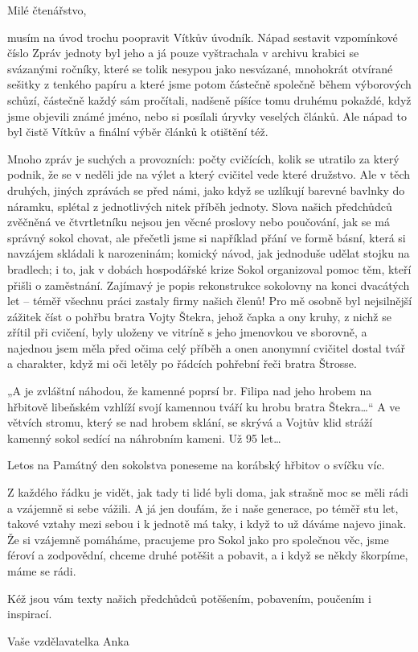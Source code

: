 Milé čtenářstvo,

musím na úvod trochu poopravit Vítkův úvodník. Nápad sestavit
vzpomínkové číslo Zpráv jednoty byl jeho a já pouze vyštrachala v
archivu krabici se svázanými ročníky, které se tolik nesypou jako
nesvázané, mnohokrát otvírané sešitky z tenkého papíru a které jsme
potom částečně společně během výborových schůzí, částečně každý sám
pročítali, nadšeně píšíce tomu druhému pokaždé, když jsme objevili známé
jméno, nebo si posílali úryvky veselých článků. Ale nápad to byl čistě
Vítkův a finální výběr článků k otištění též.

Mnoho zpráv je suchých a provozních: počty cvičících, kolik se utratilo
za který podnik, že se v neděli jde na výlet a který cvičitel vede které
družstvo. Ale v těch druhých, jiných zprávách se před námi, jako když se
uzlíkují barevné bavlnky do náramku, splétal z jednotlivých nitek příběh
jednoty. Slova našich předchůdců zvěčněná ve čtvrtletníku nejsou jen
věcné proslovy nebo poučování, jak se má správný sokol chovat, ale
přečetli jsme si například přání ve formě básní, která si navzájem
skládali k narozeninám; komický návod, jak jednoduše udělat stojku na
bradlech; i to, jak v dobách hospodářské krize Sokol organizoval pomoc
těm, kteří přišli o zaměstnání. Zajímavý je popis rekonstrukce sokolovny
na konci dvacátých let -- téměř všechnu práci zastaly firmy našich
členů! Pro mě osobně byl nejsilnější zážitek číst o pohřbu bratra Vojty
Štekra, jehož čapka a ony kruhy, z nichž se zřítil při cvičení, byly
uloženy ve vitríně s jeho jmenovkou ve sborovně, a najednou jsem měla
před očima celý příběh a onen anonymní cvičitel dostal tvář a charakter,
když mi oči letěly po řádcích pohřební řeči bratra Štrosse.

„A je zvláštní náhodou, že kamenné poprsí br. Filipa nad jeho hrobem na
hřbitově libeňském vzhlíží svojí kamennou tváří ku hrobu bratra
Štekra\ldots`` A ve větvích stromu, který se nad hrobem sklání, se
skrývá a Vojtův klid stráží kamenný sokol sedící na náhrobním kameni. Už
95 let\ldots{}

Letos na Památný den sokolstva poneseme na korábský hřbitov o svíčku
víc.

Z každého řádku je vidět, jak tady ti lidé byli doma, jak strašně moc se
měli rádi a vzájemně si sebe vážili. A já jen doufám, že i naše
generace, po téměř stu let, takové vztahy mezi sebou i k jednotě má
taky, i když to už dáváme najevo jinak. Že si vzájemně pomáháme,
pracujeme pro Sokol jako pro společnou věc, jsme féroví a zodpovědní,
chceme druhé potěšit a pobavit, a i když se někdy škorpíme, máme se
rádi.

Kéž jsou vám texty našich předchůdců potěšením, pobavením, poučením i
inspirací.

Vaše vzdělavatelka Anka

